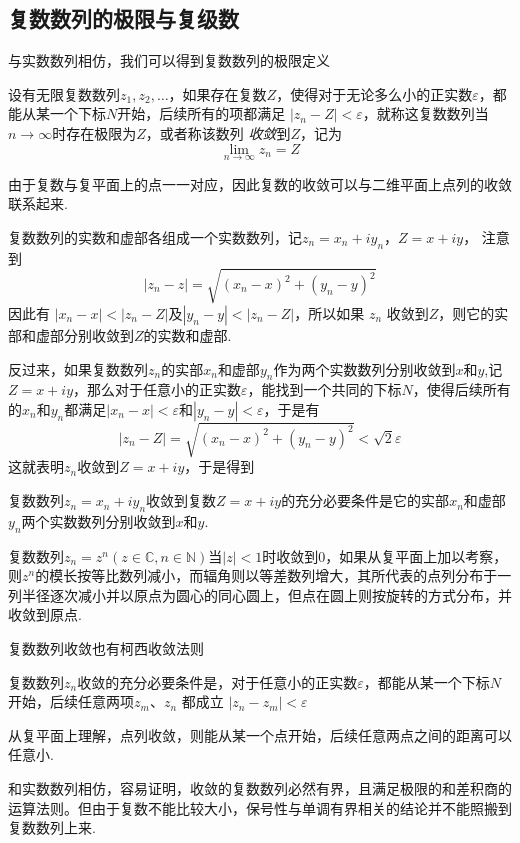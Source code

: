 \subsection{复数数列的极限与复级数}
\label{sec:limit-of-complex-number-sequence}

与实数数列相仿，我们可以得到复数数列的极限定义
\begin{definition}
  设有无限复数数列$z_1,z_2,\ldots$，如果存在复数$Z$，使得对于无论多么小的正实数$\varepsilon$，都能从某一个下标$N$开始，后续所有的项都满足 $|z_n-Z|<\varepsilon$，就称这复数数列当$n\to\infty$时存在极限为$Z$，或者称该数列 \emph{收敛}到$Z$，记为
  \[ \lim_{n\to\infty}z_n = Z \]
\end{definition}

由于复数与复平面上的点一一对应，因此复数的收敛可以与二维平面上点列的收敛联系起来.

复数数列的实数和虚部各组成一个实数数列，记$z_n=x_n+iy_n$，$Z=x+iy$， 注意到
\[ |z_n-z|=\sqrt{(x_n-x)^2+(y_n-y)^2} \]
因此有 $|x_n-x|<|z_n-Z|$及$|y_n-y|<|z_n-Z|$，所以如果 $z_n$ 收敛到$Z$，则它的实部和虚部分别收敛到$Z$的实数和虚部.

反过来，如果复数数列$z_n$的实部$x_n$和虚部$y_n$作为两个实数数列分别收敛到$x$和$y$,记$Z=x+iy$，那么对于任意小的正实数$\varepsilon$，能找到一个共同的下标$N$，使得后续所有的$x_n$和$y_n$都满足$|x_n-x|<\varepsilon$和$|y_n-y|<\varepsilon$，于是有
\[ |z_n-Z|=\sqrt{(x_n-x)^2+(y_n-y)^2}<\sqrt{2}\varepsilon \]
这就表明$z_n$收敛到$Z=x+iy$，于是得到
\begin{theorem}
  复数数列$z_n=x_n+iy_n$收敛到复数$Z=x+iy$的充分必要条件是它的实部$x_n$和虚部$y_n$两个实数数列分别收敛到$x$和$y$.
\end{theorem}

\begin{example}
  复数数列$z_n=z^n(z\in \mathbb{C}, n\in \mathbb{N})$当$|z|<1$时收敛到0，如果从复平面上加以考察，则$z^n$的模长按等比数列减小，而辐角则以等差数列增大，其所代表的点列分布于一列半径逐次减小并以原点为圆心的同心圆上，但点在圆上则按旋转的方式分布，并收敛到原点.
\end{example}

复数数列收敛也有柯西收敛法则
\begin{theorem}
  复数数列$z_n$收敛的充分必要条件是，对于任意小的正实数$\varepsilon$，都能从某一个下标$N$开始，后续任意两项$z_m$、$z_n$ 都成立 $ |z_n-z_m| < \varepsilon $
\end{theorem}
从复平面上理解，点列收敛，则能从某一个点开始，后续任意两点之间的距离可以任意小.


和实数数列相仿，容易证明，收敛的复数数列必然有界，且满足极限的和差积商的运算法则。但由于复数不能比较大小，保号性与单调有界相关的结论并不能照搬到复数数列上来.

